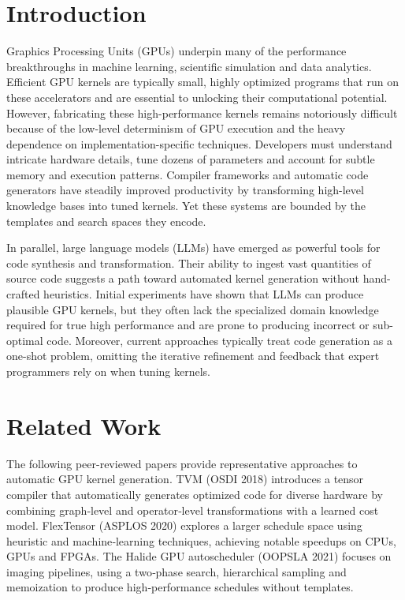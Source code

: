 \documentclass{article}
\begin{document}
\section{Introduction}
Graphics Processing Units (GPUs) underpin many of the performance breakthroughs in machine learning, scientific simulation and data analytics. Efficient GPU kernels are typically small, highly optimized programs that run on these accelerators and are essential to unlocking their computational potential. However, fabricating these high-performance kernels remains notoriously difficult because of the low-level determinism of GPU execution and the heavy dependence on implementation-specific techniques. Developers must understand intricate hardware details, tune dozens of parameters and account for subtle memory and execution patterns. Compiler frameworks and automatic code generators have steadily improved productivity by transforming high-level knowledge bases into tuned kernels. Yet these systems are bounded by the templates and search spaces they encode.

In parallel, large language models (LLMs) have emerged as powerful tools for code synthesis and transformation. Their ability to ingest vast quantities of source code suggests a path toward automated kernel generation without hand-crafted heuristics. Initial experiments have shown that LLMs can produce plausible GPU kernels, but they often lack the specialized domain knowledge required for true high performance and are prone to producing incorrect or sub-optimal code. Moreover, current approaches typically treat code generation as a one-shot problem, omitting the iterative refinement and feedback that expert programmers rely on when tuning kernels.


\section{Related Work}
The following peer-reviewed papers provide representative approaches to automatic GPU kernel generation. TVM (OSDI 2018) introduces a tensor compiler that automatically generates optimized code for diverse hardware by combining graph‑level and operator‑level transformations with a learned cost model. FlexTensor (ASPLOS 2020) explores a larger schedule space using heuristic and machine‑learning techniques, achieving notable speedups on CPUs, GPUs and FPGAs. The Halide GPU autoscheduler (OOPSLA 2021) focuses on imaging pipelines, using a two‑phase search, hierarchical sampling and memoization to produce high‑performance schedules without templates.
\end{document}
